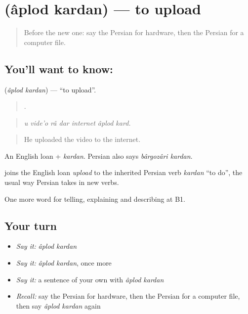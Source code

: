 \section[\texorpdfstring{\fa{آپلود} \fa{کردن} (âplod kardan)}{آپلود کردن (âplod kardan)}]{  (âplod kardan) — to upload}

\label{lesson:FA-C418-aplod-kardan}



\begin{quote}
Before the new one: say the Persian for hardware, then the Persian for a computer file.
\end{quote}

\subsection*{You'll want to know:  }
\textbf{ } (\emph{âplod kardan}) — \textquotedblleft{}to upload\textquotedblright{}.

\begin{quote}
      .
\end{quote}

\begin{quote}
\emph{u vide'o râ dar internet âplod kard.}
\end{quote}

\begin{quote}
He uploaded the video to the internet.
\end{quote}

An English loan + \emph{kardan}. Persian also says \emph{bârgozâri kardan}.

\begin{cousinweb}
\textbf{ } joins the English loan \emph{upload} to the inherited Persian verb \emph{kardan} \textquotedblleft{}to do\textquotedblright{}, the usual way Persian takes in new verbs.
\end{cousinweb}

\begin{grammarlens}[title={What you've built}]
One more word for telling, explaining and describing at B1.
\end{grammarlens}

\subsection*{Your turn}
\begin{itemize}
\raggedright
  \item \emph{Say it:} \emph{âplod kardan}
  \item \emph{Say it:} \emph{âplod kardan}, once more
  \item \emph{Say it:} a sentence of your own with \emph{âplod kardan}
  \item \emph{Recall:} say the Persian for hardware, then the Persian for a computer file, then say \emph{âplod kardan} again
\end{itemize}

